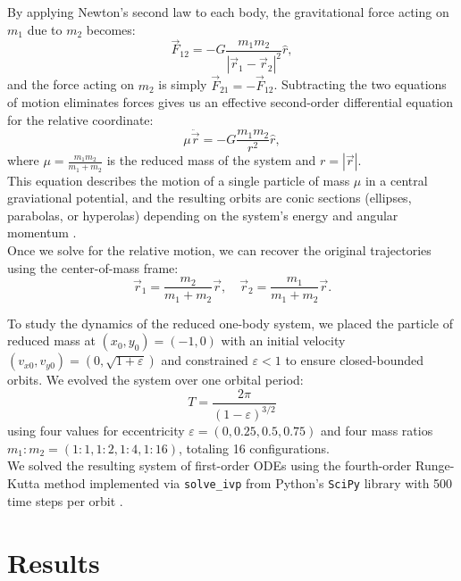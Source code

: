 \documentclass[linenumbers, twocolumn]{aastex631}
\begin{document}
\noindent By applying Newton's second law to each body, the gravitational force 
acting on $m_1$ due to $m_2$ becomes:
\begin{equation}
    \vec{F}_{12}=-G\frac{m_1m_2}{|\vec{r}_1-\vec{r}_2|^2}\hat{r},
\end{equation}
\noindent and the force acting on $m_2$ is simply $\vec{F}_{21}=-\vec{F}_{12}$. Subtracting the two
equations of motion eliminates forces gives us an effective second-order
differential equation for the relative coordinate:
\begin{equation}
    \mu\ddot{\vec{r}}=-G\frac{m_1m_2}{r^2}\hat{r},
\end{equation}
where $\mu=\frac{m_1m_2}{m_1+m_2}$ is the reduced mass of the system and $r=|\vec{r}|$.\\

\noindent This equation describes the motion of a single particle of mass $\mu$
in a central graviational potential, and the resulting orbits are conic sections
(ellipses, parabolas, or hyperolas) depending on the system's energy and
angular momentum \cite{taylor, murray}.\\

\noindent Once we solve for the relative motion, we can recover the original
trajectories using the center-of-mass frame:
\begin{equation}
    \vec{r}_1=\frac{m_2}{m_1+m_2}\vec{r},\quad \vec{r}_2=\frac{m_1}{m_1+m_2}\vec{r}.
    \label{eq:positions}
\end{equation}

\noindent To study the dynamics of the reduced one-body system, we placed the particle
of reduced mass at $(x_0,y_0)=(-1,0)$ with an initial velocity $(v_{x0}, v_{y0})=(0,\sqrt{1+\varepsilon})$
and constrained $\varepsilon<1$ to ensure closed-bounded orbits. We evolved the system
over one orbital period:
\begin{equation}
    T=\frac{2\pi}{(1-\varepsilon)^{3/2}}
\end{equation}
\noindent using four values for eccentricity $\varepsilon=(0, 0.25,0.5,0.75)$
and four mass ratios $m_1:m_2=(1:1,1:2,1:4,1:16)$, totaling 16 configurations.\\

\noindent We solved the resulting system of first-order ODEs using the
fourth-order Runge-Kutta method implemented via \texttt{solve\_ivp} from Python's
\texttt{SciPy} library with 500 time steps per orbit \cite{sullivan}. 


\section{Results} \label{sec:results}
\end{document}
